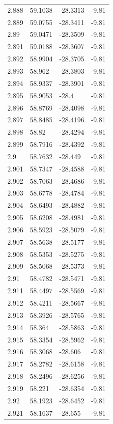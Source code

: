 \begin{tabular}{llll}
2.888 & 59.1038 & -28.3313 & -9.81 \\
2.889 & 59.0755 & -28.3411 & -9.81 \\
2.89 & 59.0471 & -28.3509 & -9.81 \\
2.891 & 59.0188 & -28.3607 & -9.81 \\
2.892 & 58.9904 & -28.3705 & -9.81 \\
2.893 & 58.962 & -28.3803 & -9.81 \\
2.894 & 58.9337 & -28.3901 & -9.81 \\
2.895 & 58.9053 & -28.4 & -9.81 \\
2.896 & 58.8769 & -28.4098 & -9.81 \\
2.897 & 58.8485 & -28.4196 & -9.81 \\
2.898 & 58.82 & -28.4294 & -9.81 \\
2.899 & 58.7916 & -28.4392 & -9.81 \\
2.9 & 58.7632 & -28.449 & -9.81 \\
2.901 & 58.7347 & -28.4588 & -9.81 \\
2.902 & 58.7063 & -28.4686 & -9.81 \\
2.903 & 58.6778 & -28.4784 & -9.81 \\
2.904 & 58.6493 & -28.4882 & -9.81 \\
2.905 & 58.6208 & -28.4981 & -9.81 \\
2.906 & 58.5923 & -28.5079 & -9.81 \\
2.907 & 58.5638 & -28.5177 & -9.81 \\
2.908 & 58.5353 & -28.5275 & -9.81 \\
2.909 & 58.5068 & -28.5373 & -9.81 \\
2.91 & 58.4782 & -28.5471 & -9.81 \\
2.911 & 58.4497 & -28.5569 & -9.81 \\
2.912 & 58.4211 & -28.5667 & -9.81 \\
2.913 & 58.3926 & -28.5765 & -9.81 \\
2.914 & 58.364 & -28.5863 & -9.81 \\
2.915 & 58.3354 & -28.5962 & -9.81 \\
2.916 & 58.3068 & -28.606 & -9.81 \\
2.917 & 58.2782 & -28.6158 & -9.81 \\
2.918 & 58.2496 & -28.6256 & -9.81 \\
2.919 & 58.221 & -28.6354 & -9.81 \\
2.92 & 58.1923 & -28.6452 & -9.81 \\
2.921 & 58.1637 & -28.655 & -9.81 \\

\end{tabular}

